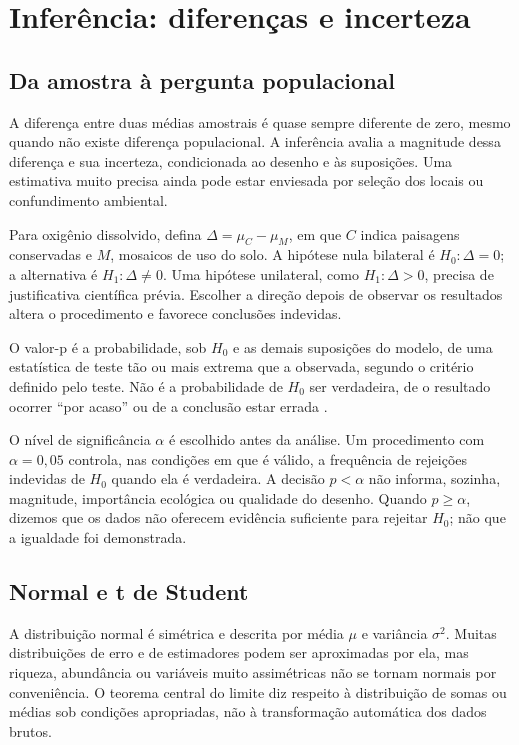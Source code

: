 \chapter{Inferência: diferenças e incerteza}

\section{Da amostra à pergunta populacional}
A diferença entre duas médias amostrais é quase sempre diferente de zero, mesmo quando não existe diferença populacional. A inferência avalia a magnitude dessa diferença e sua incerteza, condicionada ao desenho e às suposições. Uma estimativa muito precisa ainda pode estar enviesada por seleção dos locais ou confundimento ambiental.

Para oxigênio dissolvido, defina $\Delta=\mu_C-\mu_M$, em que $C$ indica paisagens conservadas e $M$, mosaicos de uso do solo. A hipótese nula bilateral é $H_0:\Delta=0$; a alternativa é $H_1:\Delta\ne0$. Uma hipótese unilateral, como $H_1:\Delta>0$, precisa de justificativa científica prévia. Escolher a direção depois de observar os resultados altera o procedimento e favorece conclusões indevidas.

\begin{conceito}
O valor-p é a probabilidade, sob $H_0$ e as demais suposições do modelo, de uma estatística de teste tão ou mais extrema que a observada, segundo o critério definido pelo teste. Não é a probabilidade de $H_0$ ser verdadeira, de o resultado ocorrer ``por acaso'' ou de a conclusão estar errada \parencite{wasserstein2016}.
\end{conceito}

O nível de significância $\alpha$ é escolhido antes da análise. Um procedimento com $\alpha=0{,}05$ controla, nas condições em que é válido, a frequência de rejeições indevidas de $H_0$ quando ela é verdadeira. A decisão $p<\alpha$ não informa, sozinha, magnitude, importância ecológica ou qualidade do desenho. Quando $p\geq\alpha$, dizemos que os dados não oferecem evidência suficiente para rejeitar $H_0$; não que a igualdade foi demonstrada.

\section{Normal e t de Student}
A distribuição normal é simétrica e descrita por média $\mu$ e variância $\sigma^2$. Muitas distribuições de erro e de estimadores podem ser aproximadas por ela, mas riqueza, abundância ou variáveis muito assimétricas não se tornam normais por conveniência. O teorema central do limite diz respeito à distribuição de somas ou médias sob condições apropriadas, não à transformação automática dos dados brutos.

